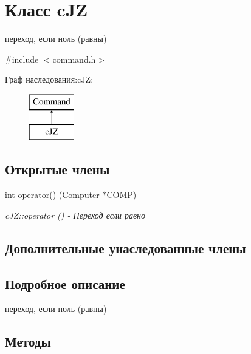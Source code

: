 \hypertarget{classc_j_z}{}\section{Класс c\+JZ}
\label{classc_j_z}


переход, если ноль (равны)  




{\ttfamily \#include $<$command.\+h$>$}

Граф наследования\+:c\+JZ\+:\begin{figure}[H]
\begin{center}
\leavevmode
\includegraphics[height=2.000000cm]{classc_j_z}
\end{center}
\end{figure}
\subsection*{Открытые члены}
\begin{DoxyCompactItemize}
\item 
int \hyperlink{classc_j_z_a0887b556d4e1f573e21b2b26588c75e8}{operator()} (\hyperlink{class_computer}{Computer} $\ast$C\+O\+MP)
\begin{DoxyCompactList}\small\item\em c\+J\+Z\+::operator () -\/ Переход если равно \end{DoxyCompactList}\end{DoxyCompactItemize}
\subsection*{Дополнительные унаследованные члены}


\subsection{Подробное описание}
переход, если ноль (равны) 

\subsection{Методы}
\hypertarget{classc_j_z_a0887b556d4e1f573e21b2b26588c75e8}{}\label{classc_j_z_a0887b556d4e1f573e21b2b26588c75e8} 
